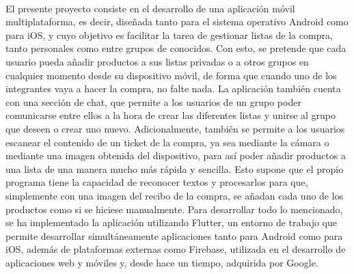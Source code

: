 \thispagestyle{empty}

\\

El presente proyecto consiste en el desarrollo de una aplicación móvil multiplataforma, es decir, diseñada tanto para el sistema operativo Android como para iOS, y cuyo objetivo es facilitar la tarea de gestionar listas de la compra, tanto personales como entre grupos de conocidos. Con esto, se pretende que cada usuario pueda añadir productos a sus listas privadas o a otros grupos en cualquier momento desde su dispositivo móvil, de forma que cuando uno de los integrantes vaya a hacer la compra, no falte nada. La aplicación también cuenta con una sección de chat, que permite a los usuarios de un grupo poder comunicarse entre ellos a la hora de crear las diferentes listas y unirse al grupo que deseen o crear uno nuevo. Adicionalmente, también se permite a los usuarios escanear el contenido de un ticket de la compra, ya sea mediante la cámara o mediante una imagen obtenida del dispositivo, para así poder añadir productos a una lista de una manera mucho más rápida y sencilla. Esto supone que el propio programa tiene la capacidad de reconocer textos y procesarlos para que, simplemente con una imagen del recibo de la compra, se añadan cada uno de los productos como si se hiciese manualmente. Para desarrollar todo lo mencionado, se ha implementado la aplicación utilizando Flutter, un entorno de trabajo que permite desarrollar simultáneamente aplicaciones tanto para Android como para iOS, además de plataformas externas como Firebase, utilizada en el desarrollo de aplicaciones web y  móviles y, desde hace un tiempo, adquirida por Google.

\vspace{0.7cm}

\\

\clearpage

\thispagestyle{empty}

\\

